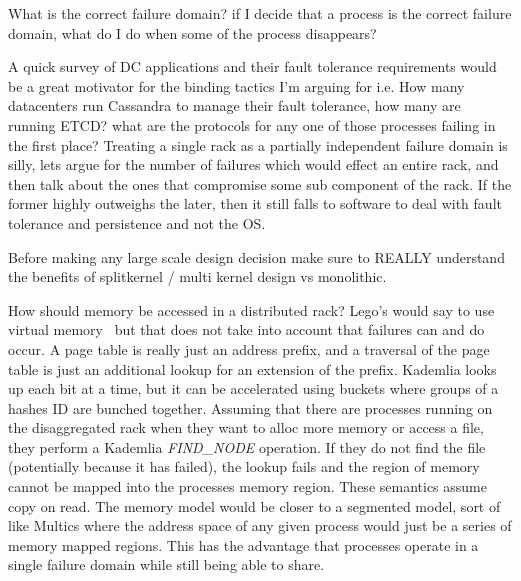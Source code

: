 What is the correct failure domain? if I decide that a process is the correct
failure domain, what do I do when some of the process disappears? 

A quick survey of DC applications and their fault tolerance requirements would
be a great motivator for the binding tactics I'm arguing for i.e. How many
datacenters run Cassandra to manage their fault tolerance, how many are
running ETCD? what are the protocols for any one of those processes failing in
the first place? Treating a single rack as a partially independent failure
domain is silly, lets argue for the number of failures which would effect an
entire rack, and then talk about the ones that compromise some sub component of
the rack. If the former highly outweighs the later, then it still falls to
software to deal with fault tolerance and persistence and not the OS.

Before making any large scale design decision make sure to REALLY understand
the benefits of splitkernel / multi kernel design vs monolithic.

How should memory be accessed in a distributed rack? Lego's would say to use
virtual memory~\cite{legoos} but that does not take into account that failures
can and do occur. A page table is really just an address prefix, and a
traversal of the page table is just an additional lookup for an extension of
the prefix. Kademlia looks up each bit at a time, but it can be accelerated
using buckets where groups of a hashes ID are bunched together. Assuming that
there are processes running on the disaggregated rack when they want to alloc
more memory or access a file, they perform a Kademlia \textit{FIND\_NODE}
operation. If they do not find the file (potentially because it has failed),
the lookup fails and the region of memory cannot be mapped into the processes
memory region. These semantics assume copy on read. The memory model would be
closer to a segmented model, sort of like Multics where the address space of
any given process would just be a series of memory mapped regions. This has the
advantage that processes operate in a single failure domain while still being
able to share.

